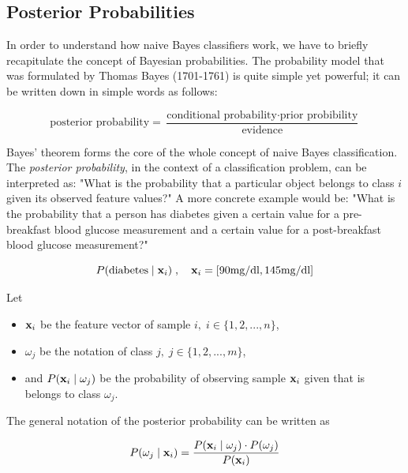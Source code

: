 \documentclass{article}
\begin{document}
\subsection{Posterior Probabilities}
\label{sec:posterior_probabilities_1}

In order to understand how naive Bayes classifiers work, we have to briefly recapitulate the concept of Bayesian probabilities.
The probability model that was formulated by Thomas Bayes (1701-1761) is quite simple yet powerful; it can be written down in simple words as follows:

\begin{equation} \text{posterior probability} = \frac{\text{conditional probability} \cdot \text{prior probibility}}{\text{evidence}} \end{equation}

 Bayes' theorem forms the core of the whole concept of naive Bayes classification. The \emph{posterior probability}, in the context of a classification problem, can be interpreted as: "What is the probability that a particular object belongs to class $i$ given its observed feature values?" A more concrete example would be: "What is the probability that a person has diabetes given a certain value for a pre-breakfast blood glucose measurement and a certain value for a post-breakfast blood glucose measurement?"


\begin{equation}  P(\text{diabetes} \mid \textbf x_i) \;, \quad \textbf x_i = [90 \text{mg/dl}, 145 \text{mg/dl}] \end{equation}

 Let

\begin{itemize}
	\item $\textbf x_i$ be the feature vector of sample $i, \; i \in \{1, 2, ..., n\}$,
	\item $\omega_j$ be the notation of class $j, \; j \in \{1, 2, ..., m\}$, 
	\item and $P(\textbf x_i \mid \omega_j)$ be the probability of observing sample $\textbf x_i$ given that is belongs to class $\omega_j$.
\end{itemize}

 The general notation of the posterior probability can be written as

\begin{equation} P(\omega_j \mid \textbf x_i) = \frac{P(\textbf x_i \mid \omega_j) \cdot P(\omega_j)}{P(\textbf x_i)} \end{equation}
\end{document}
